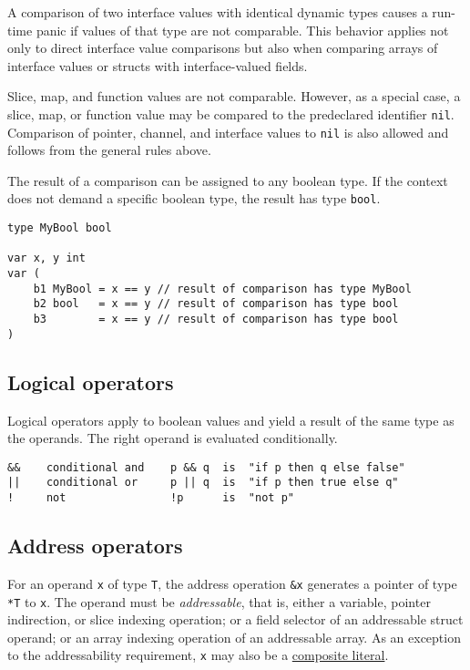 {A comparison of two interface values with identical dynamic types causes
a run-time panic if values of that type
are not comparable. This behavior applies not only to direct interface
value comparisons but also when comparing arrays of interface values or
structs with interface-valued fields.

Slice, map, and function values are not comparable. However, as a
special case, a slice, map, or function value may be compared to the
predeclared identifier \texttt{nil}. Comparison of pointer, channel, and
interface values to \texttt{nil} is also allowed and follows from the
general rules above.

The result of a comparison can be assigned to any boolean type. If the
context does not demand a specific boolean type, the result has type
\texttt{bool}.

\begin{Verbatim}[frame=single]
type MyBool bool

var x, y int
var (
    b1 MyBool = x == y // result of comparison has type MyBool
    b2 bool   = x == y // result of comparison has type bool
    b3        = x == y // result of comparison has type bool
)
\end{Verbatim}

\subsection*{Logical operators}

Logical operators apply to boolean values and
yield a result of the same type as the operands. The right operand is
evaluated conditionally.

\begin{Verbatim}[frame=single]
&&    conditional and    p && q  is  "if p then q else false"
||    conditional or     p || q  is  "if p then true else q"
!     not                !p      is  "not p"
\end{Verbatim}

\subsection*{Address operators}

For an operand \texttt{x} of type \texttt{T}, the address operation
\texttt{\&x} generates a pointer of type \texttt{*T} to \texttt{x}. The
operand must be \emph{addressable}, that is, either a variable, pointer
indirection, or slice indexing operation; or a field selector of an
addressable struct operand; or an array indexing operation of an
addressable array. As an exception to the addressability requirement,
\texttt{x} may also be a \hyperref[Composite\_literals]{composite
literal}.

}
